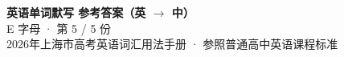\documentclass[10pt,a4paper]{article}
\begin{document}
\pagestyle{plain}

\begin{center}
{\LARGE\bfseries 英语单词默写 \quad 参考答案（英 $\to$ 中）}\\[0.22em]
{\large E 字母 · 第 5 / 5 份}\\[0.18em]
{\small 2026年上海市高考英语词汇用法手册 · 参照普通高中英语课程标准}
\end{center}

\vspace{0.2em}
\noindent{\color{rulegray}\rule{\textwidth}{0.8pt}}

\vspace{0.35em}

\vspace{0.25em}
\renewcommand{\arraystretch}{1.32}
\end{document}
